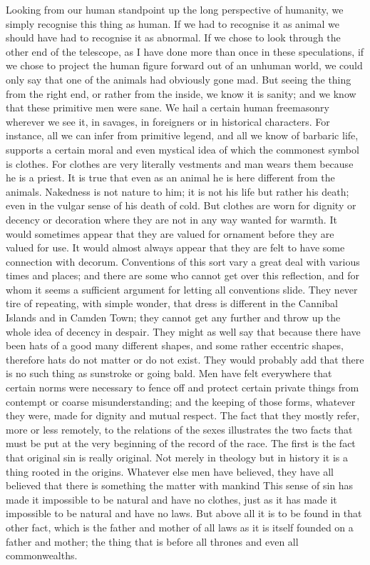 Looking from our human standpoint up the long perspective of humanity, we simply recognise this thing as human. If we had to recognise it as animal we should have had to recognise it as abnormal. If we chose to look through the other end of the telescope, as I have done more than once in these speculations, if we chose to project the human figure forward out of an unhuman world, we could only say that one of the animals had obviously gone mad. But seeing the thing from the right end, or rather from the inside, we know it is sanity; and we know that these primitive men were sane. We hail a certain human freemasonry wherever we see it, in savages, in foreigners or in historical characters. For instance, all we can infer from primitive legend, and all we know of barbaric life, supports a certain moral and even mystical idea of which the commonest symbol is clothes. For clothes are very literally vestments and man wears them because he is a priest. It is true that even as an animal he is here different from the animals. Nakedness is not nature to him; it is not his life but rather his death; even in the vulgar sense of his death of cold. But clothes are worn for dignity or decency or decoration where they are not in any way wanted for warmth. It would sometimes appear that they are valued for ornament before they are valued for use. It would almost always appear that they are felt to have some connection with decorum. Conventions of this sort vary a great deal with various times and places; and there are some who cannot get over this reflection, and for whom it seems a sufficient argument for letting all conventions slide. They never tire of repeating, with simple wonder, that dress is different in the Cannibal Islands and in Camden Town; they cannot get any further and throw up the whole idea of decency in despair. They might as well say that because there have been hats of a good many different shapes, and some rather eccentric shapes, therefore hats do not matter or do not exist. They would probably add that there is no such thing as sunstroke or going bald. Men have felt everywhere that certain norms were necessary to fence off and protect certain private things from contempt or coarse misunderstanding; and the keeping of those forms, whatever they were, made for dignity and mutual respect. The fact that they mostly refer, more or less remotely, to the relations of the sexes illustrates the two facts that must be put at the very beginning of the record of the race. The first is the fact that original sin is really original. Not merely in theology but in history it is a thing rooted in the origins. Whatever else men have believed, they have all believed that there is something the matter with mankind This sense of sin has made it impossible to be natural and have no clothes, just as it has made it impossible to be natural and have no laws. But above all it is to be found in that other fact, which is the father and mother of all laws as it is itself founded on a father and mother; the thing that is before all thrones and even all commonwealths.

